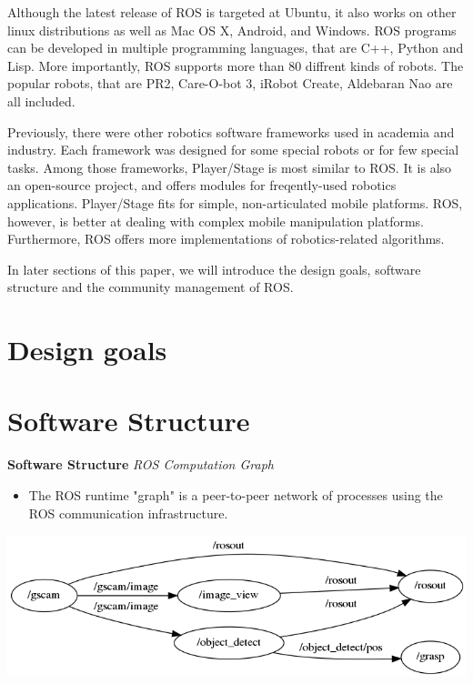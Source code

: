 \documentclass[a4paper, 10pt, conference]{ieeeconf}       %
\begin{document}
Although the latest release of ROS is targeted at Ubuntu, it also works on other linux distributions as well as Mac OS X, Android, and Windows. ROS programs can be developed in multiple programming languages, that are C++, Python and Lisp. More importantly, ROS supports more than 80 diffrent kinds of robots. The popular robots, that are PR2, Care-O-bot 3, iRobot Create, Aldebaran Nao are all included.

Previously, there were other robotics software frameworks used in academia and industry\cite{kramer_development_2007}. Each framework was designed for some special robots or for few special tasks. Among those frameworks, Player/Stage\cite{collett_player_2005} is most similar to ROS. It is also an open-source project, and offers modules for freqently-used robotics applications. Player/Stage fits for simple, non-articulated mobile platforms. ROS, however, is better at dealing with complex mobile manipulation platforms. Furthermore, ROS offers more implementations of robotics-related algorithms.

In later sections of this paper, we will introduce the design goals, software structure and the community management of ROS. 

\section{Design goals}




\section{Software Structure}

\textbf{Software Structure}
\textit{ROS Computation Graph}

\begin{itemize}
  \item The ROS runtime "graph" is a peer-to-peer network of processes using the ROS communication infrastructure.
\end{itemize}
\begin{center}
  \includegraphics[width=\textwidth]{comp_graph}
\end{center}
\end{document}
